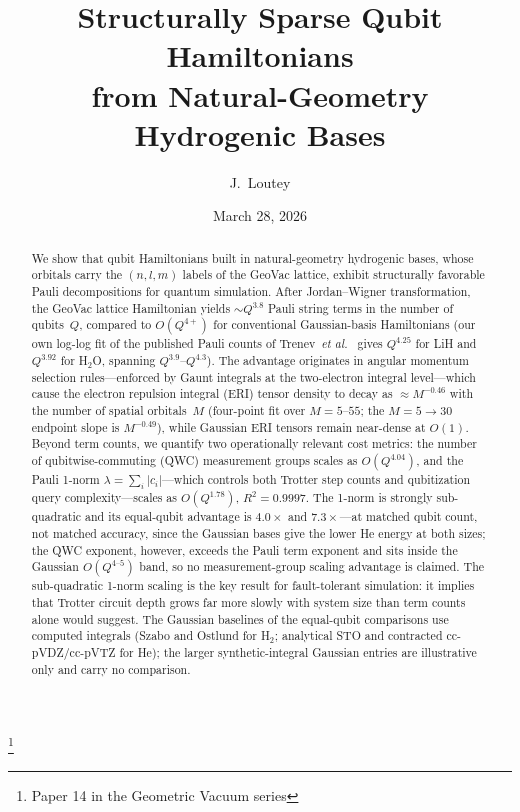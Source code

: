 \documentclass[aps,pra,twocolumn,superscriptaddress,longbibliography]{revtex4-2}
\newcommand{\gvq}[2]{#2}
\begin{document}
\title{Structurally Sparse Qubit Hamiltonians\\from Natural-Geometry Hydrogenic Bases}
\thanks{Paper 14 in the Geometric Vacuum series}

\author{J.~Loutey}

\date{March 28, 2026}

\begin{abstract}
We show that qubit Hamiltonians built in natural-geometry hydrogenic bases,
whose orbitals carry the $(n, l, m)$ labels of the GeoVac lattice,
exhibit structurally favorable Pauli decompositions for quantum simulation.
After Jordan--Wigner transformation, the GeoVac lattice Hamiltonian yields
$\sim Q^{3.8}$ Pauli string terms in the number of qubits~$Q$, compared
to $O(Q^{4+})$ for conventional Gaussian-basis Hamiltonians
(our own log-log fit of the published Pauli counts of
Trenev~\textit{et al.}~\cite{trenev2025} gives
$Q^{4.25}$ for LiH and $Q^{3.92}$ for H$_2$O, spanning $Q^{3.9}$--$Q^{4.3}$).  The advantage originates in angular momentum
selection rules---enforced by Gaunt integrals at the two-electron integral
level---which cause the electron repulsion integral (ERI) tensor density
to decay as $\approx M^{\gvq{eri_decay_4pt}{-0.46}}$ with
the number of spatial orbitals~$M$ (four-point fit over $M = 5$--$55$;
the $M = 5 \to 30$ endpoint slope is $M^{\gvq{eri_decay_2pt}{-0.49}}$), while
Gaussian ERI tensors remain near-dense at $O(1)$.
Beyond term counts, we quantify two operationally relevant cost metrics:
the number of qubitwise-commuting (QWC) measurement groups scales as
$O(Q^{4.04})$, and the Pauli 1-norm
$\lambda = \sum_i |c_i|$---which controls both Trotter step counts and
qubitization query complexity---scales as $O(Q^{1.78})$, $R^2 = 0.9997$.
The 1-norm is strongly sub-quadratic and its equal-qubit advantage is
$4.0\times$ and $7.3\times$---at matched qubit count, not matched
accuracy, since the Gaussian bases give the lower He energy at both
sizes; the QWC exponent, however, exceeds the
Pauli term exponent and sits inside the Gaussian $O(Q^{4\text{--}5})$
band, so no measurement-group scaling advantage is claimed.  The sub-quadratic 1-norm scaling is the key result
for fault-tolerant simulation: it implies that Trotter circuit depth
grows far more slowly with system size than term counts alone would
suggest.
The Gaussian baselines of the equal-qubit comparisons use computed
integrals (Szabo and Ostlund for H$_2$; analytical STO and contracted
cc-pVDZ/cc-pVTZ for He); the larger synthetic-integral Gaussian entries
are illustrative only and carry no comparison.


\end{abstract}
\end{document}
